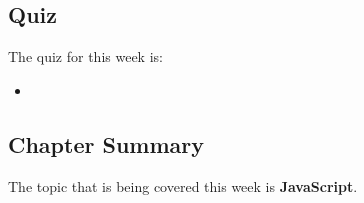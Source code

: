 \subsection{Quiz}

The quiz for this week is:

\begin{itemize}
    \item {}
\end{itemize}

\newpage

\subsection{Chapter Summary}

The topic that is being covered this week is \textbf{JavaScript}.

